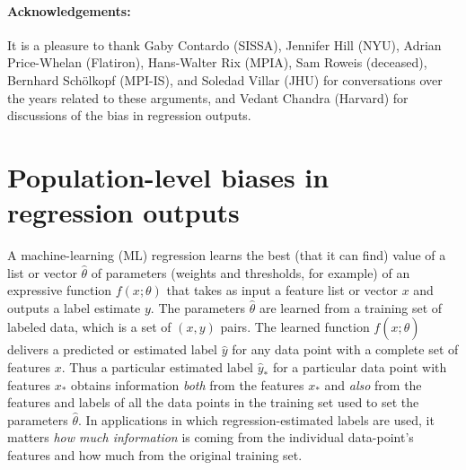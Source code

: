 \documentclass[10pt]{article}
\begin{document}
\paragraph{Acknowledgements:}
It is a pleasure to thank
  Gaby Contardo (SISSA),
  Jennifer Hill (NYU),
  Adrian Price-Whelan (Flatiron),
  Hans-Walter Rix (MPIA),
  Sam Roweis (deceased),
  Bernhard Sch\"olkopf (MPI-IS), and
  Soledad Villar (JHU)
for conversations over the years related to these arguments, and
  Vedant Chandra (Harvard)
for discussions of the bias in regression outputs.

{\raggedright\footnotesize


}

\clearpage\appendix
\section{Population-level biases in regression outputs}\label{app:toy}
A machine-learning (ML) regression learns the best (that it can find) value of a list or vector $\hat{\theta}$ of parameters (weights and thresholds, for example) of an expressive function $f(x;\theta)$ that takes as input a feature list or vector $x$ and outputs a label estimate $y$.
The parameters $\hat{\theta}$ are learned from a training set of labeled data, which is a set of $(x, y)$ pairs.
The learned function $f(x;\hat{\theta})$ delivers a predicted or estimated label $\hat{y}$ for any data point with a complete set of features $x$.
Thus a particular estimated label $\hat{y}_\ast$ for a particular data point with features $x_\ast$ obtains information \emph{both} from the features $x_\ast$ and \emph{also} from the features and labels of all the data points in the training set used to set the parameters $\hat{\theta}$.
In applications in which regression-estimated labels are used, it matters \emph{how much information} is coming from the individual data-point's features and how much from the original training set.
\end{document}

